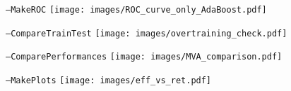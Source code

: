 \documentclass[9pt, xcolor=dvipsnames]{beamer}
\begin{document}
\begin{frame}
\begin{minipage}{1.0\textwidth}
	
	
	\begin{minipage}{0.47\textwidth}
	\begin{framed}
		\tiny\texttt{--MakeROC}
		\texttt{[image: images/ROC\_curve\_only\_AdaBoost.pdf]}
	\end{framed}
	\end{minipage}	
	\begin{minipage}{0.47\textwidth}
	\begin{framed}	
		\tiny\texttt{--CompareTrainTest}
		\texttt{[image: images/overtraining\_check.pdf]}
	\end{framed}
	\end{minipage}
	
	\begin{minipage}{0.47\textwidth}
	\begin{framed}
		
		\tiny\texttt{--ComparePerformances}
		\texttt{[image: images/MVA\_comparison.pdf]}
	\end{framed}
	\end{minipage}	
	\begin{minipage}{0.47\textwidth}
	\begin{framed}
		\tiny\texttt{--MakePlots}
		\texttt{[image: images/eff\_vs\_ret.pdf]}
	\end{framed}
	\end{minipage}
	
\end{minipage}




\end{frame}
\end{document}
